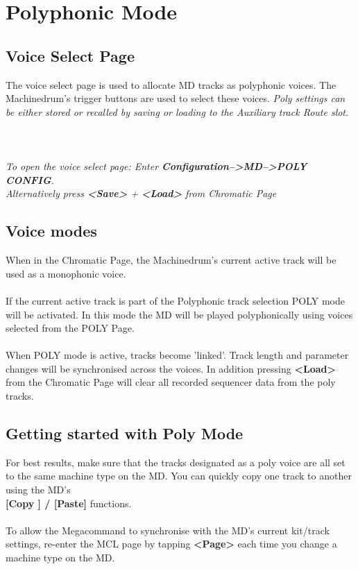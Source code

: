 \chapter{Polyphonic Mode}

\section{Voice Select Page}
The voice select page is used to allocate MD tracks as polyphonic voices.
The Machinedrum's trigger buttons are used to select these voices.
\textit{Poly settings can be either stored or recalled by saving or loading to the Auxiliary track Route slot.}\\\\
\\\\
\textit{To open the voice select page: Enter \textbf{Configuration-->MD-->POLY CONFIG}.\\Alternatively press \textbf{<Save>} + \textbf{<Load>} from  Chromatic Page}
\section{Voice modes}

When in the Chromatic Page, the Machinedrum's current active track will be used as a monophonic voice.\\
\\
If the current active track is part of the Polyphonic track selection POLY mode will be activated. In this mode the MD will be played polyphonically using voices selected from the POLY Page.\\
\\
When POLY mode is active, tracks become 'linked'. Track length and parameter changes will be synchronised across the voices. In addition pressing \textbf{<Load>} from the Chromatic Page will clear all recorded sequencer data from the poly tracks.
\section{Getting started with Poly Mode}
For best results, make sure that the tracks designated as a poly voice are all set to the same machine type on the MD. You can quickly copy one track to another using the MD's\\ \textbf{[Copy ] / [Paste]} functions.\\\\
To allow the Megacommand to synchronise with the MD's current kit/track settings, re-enter the MCL page by tapping \textbf{<Page>} each time you change a machine type on the MD.
\newpage
